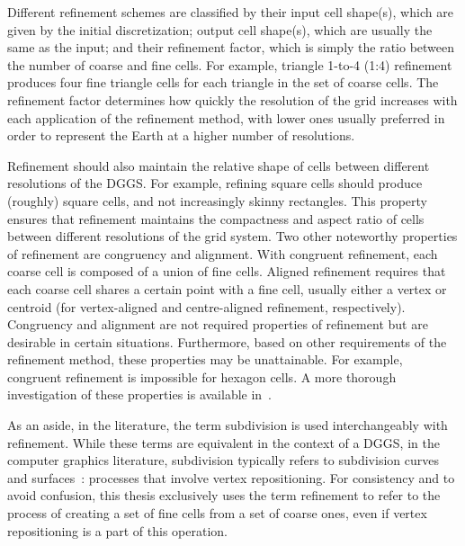 Different refinement schemes are classified by their input cell shape(s), which are given by the initial discretization; output cell shape(s), which are usually the same as the input; and their refinement factor, which is simply the ratio between the number of coarse and fine cells.
For example, triangle 1-to-4 (1:4) refinement produces four fine triangle cells for each triangle in the set of coarse cells.
The refinement factor determines how quickly the resolution of the grid increases with each application of the refinement method, with lower ones usually preferred in order to represent the Earth at a higher number of resolutions.


Refinement should also maintain the relative shape of cells between different resolutions of the DGGS.
For example, refining square cells should produce (roughly) square cells, and not increasingly skinny rectangles.
This property ensures that refinement maintains the compactness and aspect ratio of cells between different resolutions of the grid system.
Two other noteworthy properties of refinement are congruency and alignment.
With congruent refinement, each coarse cell is composed of a union of fine cells.
Aligned refinement requires that each coarse cell shares a certain point with a fine cell, usually either a vertex or centroid (for vertex-aligned and centre-aligned refinement, respectively).
Congruency and alignment are not required properties of refinement but are desirable in certain situations.
Furthermore, based on other requirements of the refinement method, these properties may be unattainable. For example, congruent refinement is impossible for hexagon cells.
A more thorough investigation of these properties is available in~\cite{mahdavi2015survey}.


As an aside, in the literature, the term subdivision is used interchangeably with refinement.
While these terms are equivalent in the context of a DGGS, in the computer graphics literature, subdivision typically refers to subdivision curves and surfaces~\cite{bohm1983sudividing, catmull1978recursively, loop1987smooth}: processes that involve vertex repositioning.
For consistency and to avoid confusion, this thesis exclusively uses the term refinement to refer to the process of creating a set of fine cells from a set of coarse ones, even if vertex repositioning is a part of this operation.


